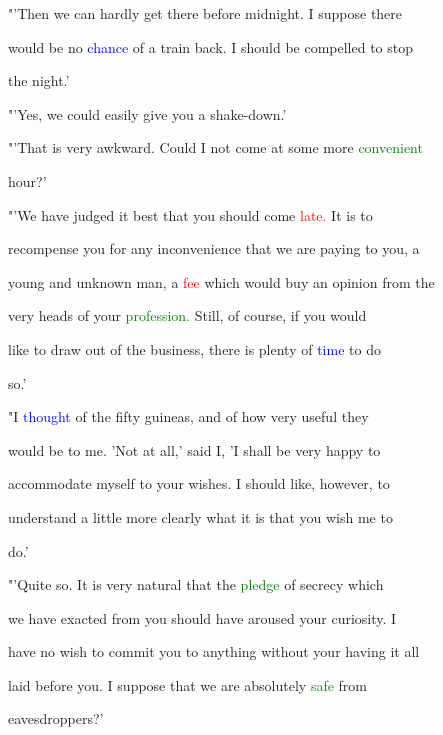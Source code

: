  "'Then we can hardly get there before midnight. I suppose there

 would be no \textcolor{blue}{chance} of a train back. I should be compelled to stop

 the night.'



 "'Yes, we could easily give you a shake-down.'



 "'That is very awkward. Could I not come at some more \textcolor{green}{convenient}

 hour?'



 "'We have judged it best that you should come \textcolor{red}{late.} It is to

 recompense you for any inconvenience that we are \textcolor{BurntOrange}{paying} to you, a

 \textcolor{BurntOrange}{young} and \textcolor{BurntOrange}{unknown} man, a \textcolor{red}{fee} which would buy an opinion from the

 very heads of your \textcolor{green}{profession.} Still, of course, if you would

 like to draw out of the business, there is plenty of \textcolor{blue}{time} to do

 so.'



 "I \textcolor{blue}{thought} of the fifty guineas, and of how very useful they

 would be to me. 'Not at all,' said I, 'I shall be very \textcolor{BurntOrange}{happy} to

 accommodate myself to your wishes. I should like, however, to

 understand a little more clearly what it is that you wish me to

 do.'



 "'Quite so. It is very natural that the \textcolor{green}{pledge} of \textcolor{BurntOrange}{secrecy} which

 we have exacted from you should have \textcolor{BurntOrange}{aroused} your \textcolor{BurntOrange}{curiosity.} I

 have no wish to commit you to anything without your having it all

 laid before you. I suppose that we are absolutely \textcolor{green}{safe} from

 eavesdroppers?'



